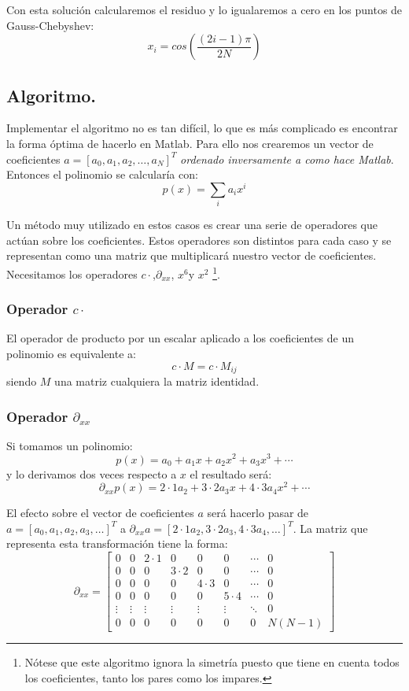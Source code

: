 Con esta solución calcularemos el residuo y lo igualaremos a cero
en los puntos de Gauss-Chebyshev:\[
x_{i}=cos\left(\frac{(2i-1)\pi}{2N}\right)\]



\subsection{Algoritmo.}

Implementar el algoritmo no es tan difícil, lo que es más complicado
es encontrar la forma óptima de hacerlo en Matlab. Para ello nos crearemos
un vector de coeficientes \emph{$a=[a_{0},a_{1},a_{2},\ldots,a_{N}]^{T}$}
\emph{ordenado inversamente a como hace Matlab}. Entonces el polinomio
se calcularía con:\[
p(x)=\sum_{i}a_{i}x^{i}\]


Un método muy utilizado en estos casos es crear una serie de operadores
que actúan sobre los coeficientes. Estos operadores son distintos
para cada caso y se representan como una matriz que multiplicará nuestro
vector de coeficientes. Necesitamos los operadores $c\cdot$,$\partial_{xx}$,
$x^{6}$y $x^{2}$%
\footnote{Nótese que este algoritmo ignora la simetría puesto que tiene en cuenta
todos los coeficientes, tanto los pares como los impares.%
}.


\subsubsection{Operador $c\cdot$}

El operador de producto por un escalar aplicado a los coeficientes
de un polinomio es equivalente a:\[
c\cdot M=c\cdot M_{ij}\]
siendo $M$ una matriz cualquiera la matriz identidad.


\subsubsection{Operador $\partial_{xx}$}

Si tomamos un polinomio:\[
p(x)=a_{0}+a_{1}x+a_{2}x^{2}+a_{3}x^{3}+\cdots\]
y lo derivamos dos veces respecto a $x$ el resultado será:\[
\partial_{xx}p(x)=2\cdot1a_{2}+3\cdot2a_{3}x+4\cdot3a_{4}x^{2}+\cdots\]


El efecto sobre el vector de coeficientes $a$ será hacerlo pasar
de $a=[a_{0},a_{1},a_{2},a_{3},\ldots]^{T}$ a $\partial_{xx}a=[2\cdot1a_{2},3\cdot2a_{3},4\cdot3a_{4},\ldots]^{T}$.
La matriz que representa esta transformación tiene la forma:\[
\partial_{xx}=\left[\begin{array}{cccccccc}
0 & 0 & 2\cdot1 & 0 & 0 & 0 & \cdots & 0\\
0 & 0 & 0 & 3\cdot2 & 0 & 0 & \cdots & 0\\
0 & 0 & 0 & 0 & 4\cdot3 & 0 & \cdots & 0\\
0 & 0 & 0 & 0 & 0 & 5\cdot4 & \cdots & 0\\
\vdots & \vdots & \vdots & \vdots & \vdots & \vdots & \ddots & 0\\
0 & 0 & 0 & 0 & 0 & 0 & 0 & N(N-1)\end{array}\right]\]



